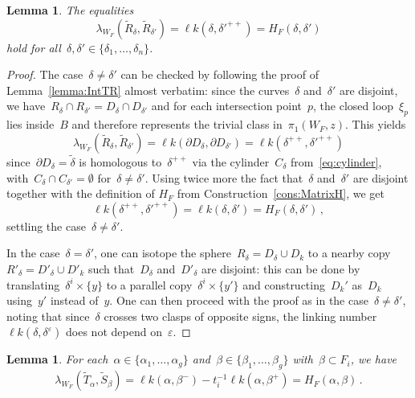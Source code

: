 \documentclass[10.9pt,a4paper]{amsart}
\newtheorem{lemma}[theorem]{Lemma}
\theoremstyle{definition}
\theoremstyle{remark}
\newcommand{\lk}{\ell k}
\begin{document}
\begin{lemma}
\label{lemma:IntRR}
The equalities
\[
\lambda_{W_F}(\tilde R_{\delta},\tilde R_{\delta'}) = \lk(\delta, \delta'^{++}) =  H_F(\delta, \delta')
\]
hold  for all~$\delta,\delta'\in\{\delta_1,\dots,\delta_n\}$.
\end{lemma}

\begin{proof}
The case~$\delta\neq\delta'$ can be checked by following the proof of Lemma~\ref{lemma:IntTR} almost verbatim:
since the curves~$\delta$ and~$\delta'$ are disjoint,
we have~$R_{\delta} \cap R_{\delta'} = D_{\delta} \cap D_{\delta'}$ and for each intersection point~$p$,
the closed loop~$\xi_p$ lies inside~$B$ and therefore represents the trivial class in~$\pi_1(W_F,z)$.
This yields
\[
\lambda_{W_F}(\tilde R_{\delta},\tilde R_{\delta'}) = \lk(\partial D_{\delta},\partial D_{\delta'})=\lk(\delta^{++}, \delta'^{++})
\]
since~$\partial D_{\delta}=\tilde\delta$ is homologous to~$\delta^{++}$ via the cylinder~$C_{\delta}$ from~\eqref{eq:cylinder}, with~$C_{\delta}\cap C_{\delta'}=\emptyset$ for~$\delta\neq\delta'$.
Using twice more the fact that~$\delta$ and~$\delta'$ are disjoint together with the definition of $H_F$ from Construction~\ref{cons:MatrixH}, we get
\[
\lk(\delta^{++}, \delta'^{++})=\lk(\delta, \delta')=H_F(\delta, \delta')\,,
\]
settling the case~$\delta\neq\delta'$.

In the case~$\delta=\delta'$, one can isotope the sphere~$R_{\delta}=D_{\delta}\cup D_k$ to a nearby copy~$R'_{\delta}=D'_{\delta}\cup D'_k$ such that~$D_{\delta}$ and~$D'_{\delta}$ are disjoint: this can be done by translating~$\delta^i\times\{y\}$ to a parallel copy~$\delta^i\times\{y'\}$ and constructing~$D_k'$ as~$D_k$ using~$y'$ instead of~$y$.
One can then proceed with the proof as in the case~$\delta\neq\delta'$, noting that since~$\delta$ crosses two clasps of opposite signs, the linking number~$\lk(\delta,\delta^\varepsilon)$ does not depend on~$\varepsilon$.
\end{proof}



\begin{lemma}
\label{lemma:IntTS}
For each~$\alpha\in\{\alpha_1,\dots,\alpha_g\}$ and~$\beta\in\{\beta_1,\dots,\beta_g\}$ with~$\beta\subset F_{i}$, we have
\[
\lambda_{W_F}(\tilde T_{\alpha},\tilde S_{\beta}) = \lk(\alpha,\beta^-) - t^{-1}_{i}\lk(\alpha, \beta^+) = H_F(\alpha, \beta)\,.
\]
\end{lemma}
\end{document}
